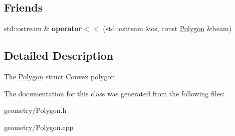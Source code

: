 \subsection*{Friends}
\begin{DoxyCompactItemize}
\item 
\mbox{\label{class_polygon_a3d971bd1da5beb2188d6d011bf0becdd}} 
std\+::ostream \& {\bfseries operator$<$$<$} (std\+::ostream \&os, const \mbox{\hyperlink{class_polygon}{Polygon}} \&beam)
\end{DoxyCompactItemize}


\subsection{Detailed Description}
The \mbox{\hyperlink{class_polygon}{Polygon}} struct Convex polygon. 

The documentation for this class was generated from the following files\+:\begin{DoxyCompactItemize}
\item 
geometry/Polygon.\+h\item 
geometry/Polygon.\+cpp\end{DoxyCompactItemize}
